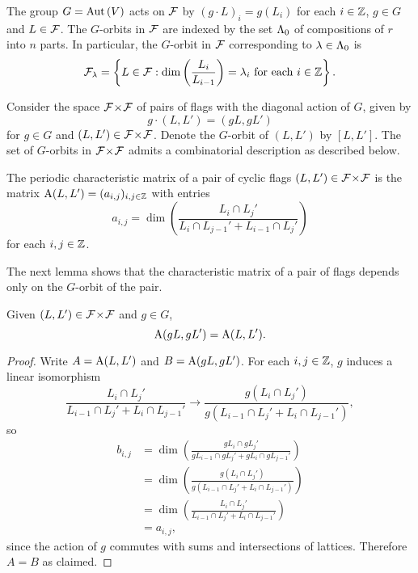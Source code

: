 \documentclass[a4paper, 11pt]{report}
\begin{document}
The group $G=\operatorname{Aut}{(V)}$ acts on $\mathcal{F}$ by $(g\cdot L)_i = g(L_i)$ for each $i\in\mathbb{Z}$, $g\in G$ and $L\in\mathcal{F}$. The $G$-orbits in $\mathcal{F}$ are indexed by the set $\Lambda_0{}$ of compositions of $r$ into $n$ parts. In particular, the $G$-orbit in $\mathcal{F}$ corresponding to $\lambda\in\Lambda_0{}$ is
\begin{equation*}
\mathcal{F}_\lambda = \left\{L\in\mathcal{F}: \dim\left(\frac{L_i}{L_{i-1}}\right) = \lambda_i \text{ for each } i\in\mathbb{Z}\right\}.
\end{equation*}

Consider the space ${\mathcal{F}\!\times\!\mathcal{F}}$ of pairs of flags with the diagonal action of $G$, given by
\begin{equation*}
g\cdot(L,L') = (gL,gL')
\end{equation*}
for $g\in G$ and $(L,L')\in{\mathcal{F}\!\times\!\mathcal{F}}$. Denote the $G$-orbit of $(L,L')$ by $[L,L']$. The set of $G$-orbits in ${\mathcal{F}\!\times\!\mathcal{F}}$ admits a combinatorial description as described below.

\begin{definition}\label{def:characteristic-matrix}
The periodic characteristic matrix of a pair of cyclic flags $(L,L')\in{\mathcal{F}\!\times\!\mathcal{F}}$ is the matrix $\operatorname{A}(L,L')=(a_{i,j})_{i,j\in\mathbb{Z}}$ with entries
\begin{equation*}
a_{i,j} = \dim\left(\frac{L_i\cap L_j'}{L_i\cap L_{j-1}' + L_{i-1}\cap L_j'}\right)
\end{equation*}
for each $i,j\in\mathbb{Z}$.
\end{definition}

The next lemma shows that the characteristic matrix of a pair of flags depends only on the $G$-orbit of the pair.
\begin{lemma}
Given $(L,L')\in{\mathcal{F}\!\times\!\mathcal{F}}$ and $g\in G$,
\begin{equation*}
\operatorname{A}(gL,gL') = \operatorname{A}(L,L').
\end{equation*}
\end{lemma}

\begin{proof}
Write $A=\operatorname{A}(L,L')$ and $B=\operatorname{A}(gL,gL')$. For each $i,j\in\mathbb{Z}$, $g$ induces a linear isomorphism
\begin{equation*}
\frac{L_i\cap L_j'}{L_{i-1}\cap L_j' + L_i\cap L_{j-1}'} \to \frac{g(L_i\cap L_j')}{g(L_{i-1}\cap L_j' + L_i\cap L_{j-1}')},
\end{equation*}
so
\begin{align*}
b_{i,j}
&= \dim\left(\frac{gL_i\cap gL_j'}{gL_{i-1}\cap gL_j' + gL_i\cap gL_{j-1}'}\right)\\
&= \dim\left(\frac{g(L_i\cap L_j')}{g(L_{i-1}\cap L_j' + L_i\cap L_{j-1}')}\right)\\
&= \dim\left(\frac{L_i\cap L_j'}{L_{i-1}\cap L_j' + L_i\cap L_{j-1}'}\right)\\
&= a_{i,j},
\end{align*}
since the action of $g$ commutes with sums and intersections of lattices. Therefore $A=B$ as claimed.
\end{proof}
\end{document}
